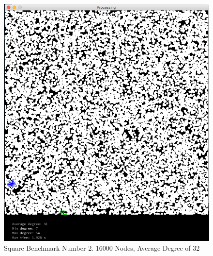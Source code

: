 \documentclass{article}
\begin{document}
\begin{center}
    \begin{figure}
        \includegraphics[scale=0.45]{./images/square_2.png}
        \caption{Square Benchmark Number 2. 16000 Nodes, Average Degree of 32}
        \label{square2}
    \end{figure}
\end{center}
\end{document}
